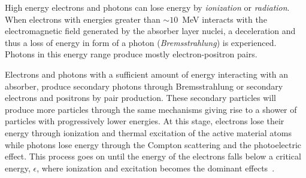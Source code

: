 High energy electrons and photons can lose energy by \emph{ionization} or
\emph{radiation}. When electrons with energies greater than $\sim 10$~MeV
interacts with the electromagnetic field generated by the absorber layer nuclei,
a deceleration and thus a loss of energy in form of a photon
(\emph{Bremsstrahlung}) is experienced. Photons in this energy range produce
mostly electron-positron pairs.

Electrons and photons with a sufficient amount of energy interacting with an
absorber, produce secondary photons through Bremsstrahlung or secondary
electrons and positrons by pair production. These secondary particles will
produce more particles through the same mechanisms giving rise to a shower of
particles with progressively lower energies. At this stage, electrons lose their
energy through ionization and thermal excitation of the active material atoms
while photons lose energy through the Compton scattering and the photoelectric
effect. This process goes on until the energy of the electrons falls below a
critical energy, $\epsilon$, where ionization and excitation becomes the
dominant effects~\cite{Calorimetry}.
